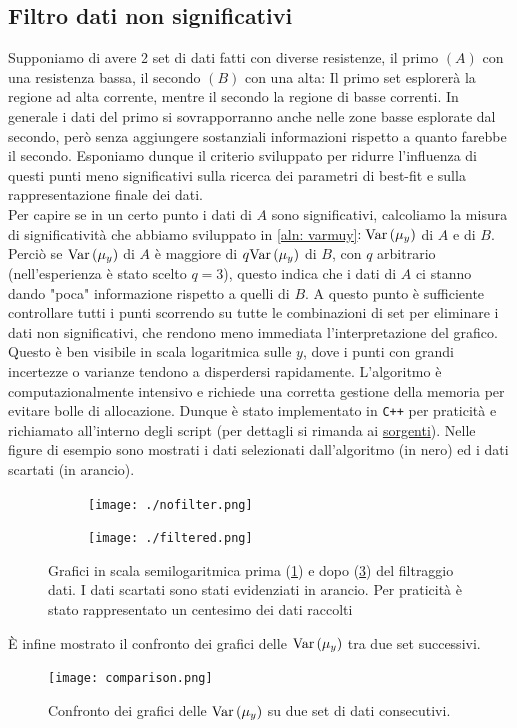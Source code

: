 \documentclass{article}[a4paper, oneside, 11pt]
\begin{document}
\subsection{Filtro dati non significativi}
Supponiamo di avere 2 set di dati fatti con diverse resistenze, il primo $(A)$
con una resistenza bassa, il secondo $(B)$ con una alta: Il primo set
esplorer\`a la regione ad alta corrente, mentre il secondo la regione di basse
correnti.
In generale i dati del primo si sovrapporranno anche nelle zone basse esplorate
dal secondo, per\`o senza aggiungere sostanziali informazioni rispetto a quanto
farebbe il secondo.
Esponiamo dunque il criterio sviluppato per ridurre l'influenza di questi
punti meno significativi sulla ricerca dei parametri di best-fit e sulla
rappresentazione finale dei dati.\\
Per capire se in un certo punto i dati di $A$ sono significativi, calcoliamo
la misura di significativit\`a che abbiamo sviluppato in \eqref{aln: varmuy}$:
\text{Var}\left(\mu_y\right)$ di $A$ e di $B$. Perci\`o se $\text{Var}\left(\mu_y\right)$ di $A$ \`e maggiore di 
$q\text{Var}\left(\mu_y\right)$ di $B$, con $q$ arbitrario (nell'esperienza \`e stato scelto
$q = 3$), questo indica che i dati di $A$
ci stanno dando "poca" informazione rispetto a quelli di $B$. A questo punto
\`e sufficiente controllare tutti i punti scorrendo su tutte le combinazioni
di set per eliminare i dati non significativi, che rendono meno
immediata l'interpretazione del grafico. Questo \`e ben visibile in scala
logaritmica sulle $y$, dove i punti con grandi incertezze o varianze tendono
a disperdersi rapidamente.
L’algoritmo \`e computazionalmente intensivo e richiede una corretta gestione
della memoria per evitare bolle di allocazione. Dunque \`e stato implementato
in \verb'C++' per praticit\`a e richiamato all’interno degli script (per dettagli si 
rimanda ai 
\href{https://github.com/LucaCiucci/relaz_seme/tree/master/Cartella_fit/filter_src}{sorgenti}).
Nelle figure di esempio sono mostrati i dati selezionati dall’algoritmo
(in nero) ed i dati scartati (in arancio). 

\begin{figure}[!htbp]
\centering
\begin{subfigure}{.5\textwidth}
	\centering 
 		\texttt{[image: ./nofilter.png]}
		\caption{\label{fig: nofilter}}	
\end{subfigure}%
\begin{subfigure}{.5\textwidth}
	\centering 
 		\texttt{[image: ./filtered.png]}
 	\caption{\label{fig: filtered}}
\end{subfigure}
\caption{Grafici in scala semilogaritmica prima (\ref{fig: nofilter}) e dopo 
(\ref{fig: filtered}) del filtraggio dati. I dati scartati sono stati
evidenziati in arancio. Per praticit\`a \`e stato rappresentato un centesimo
dei dati raccolti}
\end{figure}
\`E infine mostrato il confronto dei grafici delle $\text{Var}\left(\mu_y\right)$
tra due set successivi.
\begin{figure}[!h]
	\centering 
 		\texttt{[image: comparison.png]}
 	\caption{Confronto dei grafici delle $\text{Var}\left(\mu_y\right)$ su due set di
	dati consecutivi. \label{fig: comparison}}
\end{figure}
\end{document}
